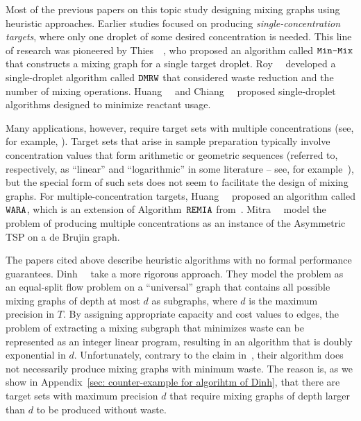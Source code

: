 Most of the previous papers on this topic study designing mixing graphs using
heuristic approaches. Earlier studies
focused on producing \emph{single-concentration targets}, where only one droplet of some 
desired concentration is needed. 
This line of research was pioneered by Thies~{\etal}~\cite{thies2008abstraction},
who proposed an algorithm  called $\texttt{Min-Mix}$ 
that constructs a mixing graph for a single target droplet.
Roy~{\etal}~\cite{roy2010optimization} developed a single-droplet
algorithm called $\texttt{DMRW}$ that considered waste reduction and the number of mixing operations.
Huang~{\etal}~\cite{huang2012reactant} and Chiang~{\etal}~\cite{chiang2013graph}
proposed single-droplet algorithms designed to minimize reactant usage.

Many applications, however, require target sets with multiple concentrations
(see, for example, 
\cite{xu2008automated,xu2010defect,srinivasan2004droplet,srinivasan2004integrated,hsieh1998automated}).
Target sets that arise in sample preparation typically involve concentration values that form
arithmetic or geometric sequences
(referred to, respectively, as ``linear'' and ``logarithmic'' in some literature -- see, for example~\cite{kim2008serial}), 
but the special form of such sets does not seem to facilitate the design of mixing graphs.
For multiple-concentration targets, Huang~{\etal}~\cite{huang2013reactant} proposed an 
algorithm called $\texttt{WARA}$, which is an extension of Algorithm~$\texttt{REMIA}$ from~\cite{huang2012reactant}.
Mitra~{\etal}~\cite{mitra2012chip} model the problem of producing multiple concentrations
as an instance of the Asymmetric TSP on a de Brujin graph.

The papers cited above describe heuristic algorithms with no formal performance
guarantees. Dinh~{\etal}~\cite{dinh2014network} take a more rigorous approach.
They model the problem as an equal-split flow problem \cite{meyers2009integer} on a
``universal'' graph that contains all possible mixing graphs of depth at most $d$ as subgraphs,
where $d$ is the maximum precision in $T$. 
By assigning appropriate capacity and cost values to edges, the problem of 
extracting a mixing subgraph that minimizes waste
can be represented as an integer linear program, resulting
in an algorithm that is doubly exponential in $d$. Unfortunately, contrary to the claim in~\cite{dinh2014network},
their algorithm does not necessarily produce mixing graphs with minimum waste. The
reason is, as we show in Appendix~\ref{sec: counter-example for algorihtm of Dinh},
that there are target sets with maximum precision $d$ that require mixing graphs of depth
larger than $d$ to be produced without waste.

